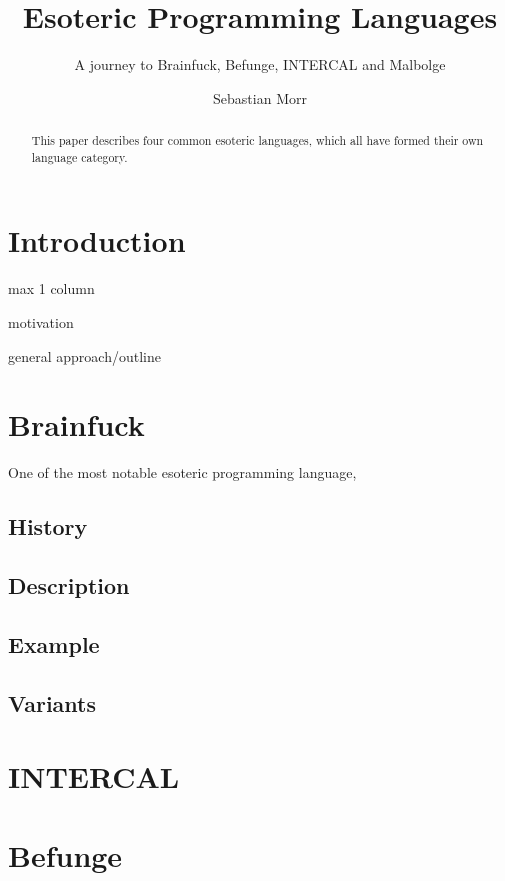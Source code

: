 \documentclass{sig-alternate}
\title{Esoteric Programming Languages}
\subtitle{A journey to Brainfuck, Befunge, INTERCAL and Malbolge}
\author{\alignauthor Sebastian Morr\\\email{sebastian@morr.cc}}
\begin{document}
\maketitle

\begin{abstract}
    This paper describes four common esoteric languages, which all have formed their own language category.
\end{abstract}

\section{Introduction}

max 1 column

motivation

general approach/outline

\section{Brainfuck}

One of the most notable esoteric programming language, 

\subsection{History}

\blindtext[1]

\subsection{Description}

\blindtext[1]

\subsection{Example}

\blindtext[1]

\subsection{Variants}

\blindtext[1]

\section{\textsc{INTERCAL}}


\section{Befunge}
\end{document}
